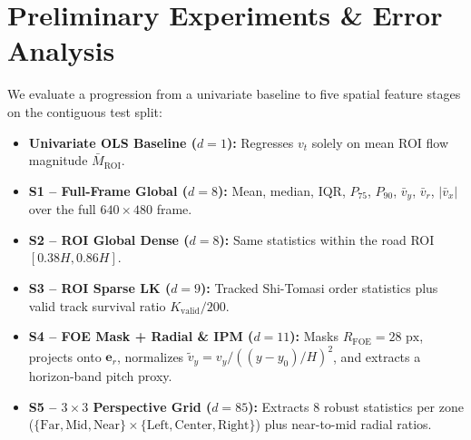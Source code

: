 \documentclass[10pt,twocolumn]{article}
\begin{document}
\section{Preliminary Experiments \& Error Analysis}
We evaluate a progression from a univariate baseline to five spatial feature stages on the contiguous test split:
\begin{itemize}
  \item \textbf{Univariate OLS Baseline ($d=1$):} Regresses $v_t$ solely on mean ROI flow magnitude $\bar{M}_{\text{ROI}}$.
  \item \textbf{S1 -- Full-Frame Global ($d=8$):} Mean, median, IQR, $P_{75}$, $P_{90}$, $\bar{v}_y$, $\bar{v}_r$, $|\bar{v}_x|$ over the full $640\times 480$ frame.
  \item \textbf{S2 -- ROI Global Dense ($d=8$):} Same statistics within the road ROI $[0.38H, 0.86H]$.
  \item \textbf{S3 -- ROI Sparse LK ($d=9$):} Tracked Shi-Tomasi order statistics plus valid track survival ratio $K_{\text{valid}}/200$.
  \item \textbf{S4 -- FOE Mask + Radial \& IPM ($d=11$):} Masks $R_{\text{FOE}}=28\text{ px}$, projects onto $\hat{\mathbf{e}}_r$, normalizes $\tilde{v}_y = v_y/((y-y_0)/H)^2$, and extracts a horizon-band pitch proxy.
  \item \textbf{S5 -- $3\times 3$ Perspective Grid ($d=85$):} Extracts 8 robust statistics per zone ($\{\text{Far}, \text{Mid}, \text{Near}\} \times \{\text{Left}, \text{Center}, \text{Right}\}$) plus near-to-mid radial ratios.
\end{itemize}

\begin{table}[t!]
\centering
\caption{Milestone Baseline \& Spatial Ablation (Contiguous Test Split).}
\label{tab:milestone_results}
\footnotesize
\setlength{\tabcolsep}{2.8pt}
\end{table}
\end{document}
